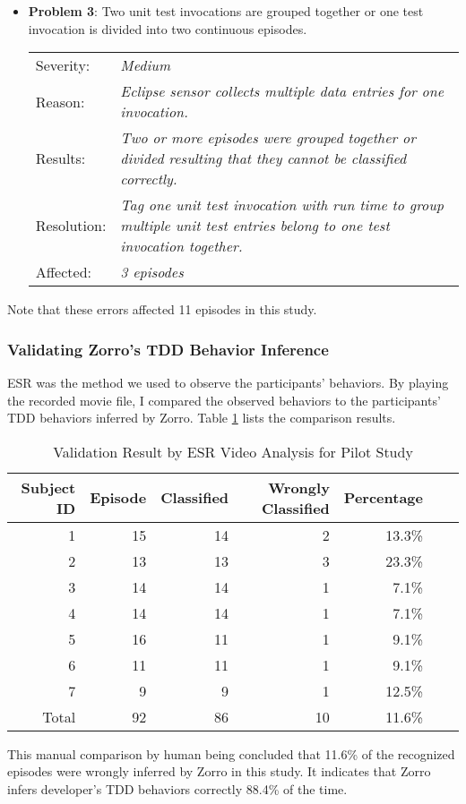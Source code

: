 \begin{itemize}
\item \textbf{Problem 3}: Two unit test invocations are grouped
together or one test invocation is divided into two continuous
episodes.
  \begin{tabular}{lp{10cm}}
    Severity: & \small\textit{Medium}\\
    Reason: & \small\textit{Eclipse sensor collects multiple data 
              entries for one invocation.}\\
    Results: & \small\textit{Two or more episodes were grouped 
               together or divided resulting that they cannot be 
               classified correctly.} \\
    Resolution: & \small\textit{Tag one unit test invocation with run 
                  time to group multiple unit test entries belong to 
                  one test invocation together.} \\
    Affected: & \small\textit{3 episodes}
  \end{tabular}
\end{itemize}

\noindent Note that these errors affected 11 episodes in this study. 

\subsubsection{Validating Zorro's TDD Behavior Inference}
ESR was the method we used to observe the participants' behaviors. By
playing the recorded movie file, I compared the observed behaviors to
the participants' TDD behaviors inferred by Zorro. Table
\ref{tab:EsrPilotStudy} lists the comparison results.
\begin{table}[htbp]
\centering
  \caption{Validation Result by ESR Video Analysis for Pilot Study}\label{tab:EsrPilotStudy}  
  \begin{tabular}{|r|r|r|r|r|r|r|}
  \hline
    Subject ID & Episode & Classified & Wrongly Classified & Percentage \\ \hline
    1          & 15 &  14 &  2 & 13.3\% \\ \hline
    2          & 13 &  13 &  3 & 23.3\% \\ \hline
    3          & 14 &  14 &  1 &  7.1\% \\ \hline
    4          & 14 &  14 &  1 &  7.1\% \\ \hline
    5          & 16 &  11 &  1 &  9.1\% \\ \hline
    6          & 11 &  11 &  1 &  9.1\% \\ \hline
    7          &  9 &   9 &  1 & 12.5\% \\ \hline \hline
    Total      & 92 &  86 & 10 & 11.6\% \\ 
  \hline
  \end{tabular}
\end{table}
This manual comparison by human being concluded that 11.6\% of the
recognized episodes were wrongly inferred by Zorro in this study. It
indicates that Zorro infers developer's TDD behaviors correctly 88.4\%
of the time.


